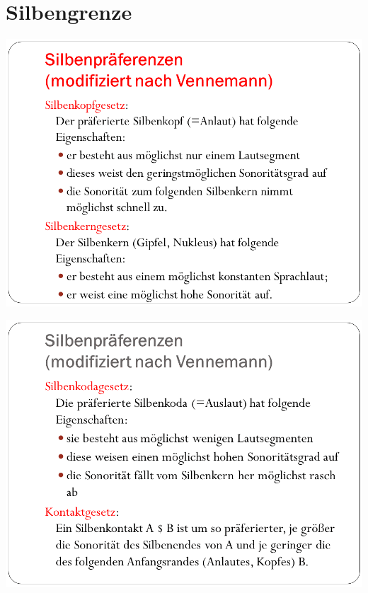 \documentclass[
  letterpaper,
]{scrbook}
\begin{document}
\hypertarget{silbengrenze}{%
\section{Silbengrenze}\label{silbengrenze}}

\includegraphics[width=1\textwidth,height=\textheight]{./pictures/Wagner_Maas_Duden_Petric_24.PNG}

\includegraphics[width=1\textwidth,height=\textheight]{./pictures/Wagner_Maas_Duden_Petric_25.PNG}
\end{document}

